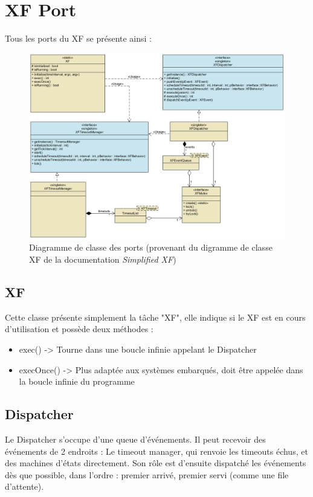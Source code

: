 \section{XF Port}
Tous les ports du XF se présente ainsi :
\begin{figure}[H]
    \centering
    \includegraphics[width=\textwidth]{Images/xf/XFPorts.PNG}
    \caption[Diagramme de classe des ports]{Diagramme de classe des ports
    (provenant du digramme de classe XF de la documentation \emph{Simplified XF}\footnotemark[1])}
\end{figure}

\subsection{XF}
Cette classe présente simplement la tâche "XF", elle indique si le XF est en cours d'utilisation
et possède deux méthodes :
\begin{itemize}
    \item exec() -> Tourne dans une boucle infinie appelant le Dispatcher
    \item execOnce() -> Plus adaptée aux systèmes embarqués, doit être appelée dans la boucle
            infinie du programme
\end{itemize}

\subsection{Dispatcher}
Le Dispatcher s'occupe d'une queue d'événements. Il peut recevoir des événements de 2 endroits : Le timeout manager, qui renvoie les timeouts échus, et des machines
d'états directement.
Son rôle est d'ensuite dispatché les événements dès que possible, dans l'ordre :
premier arrivé, premier servi (comme une file d'attente).

